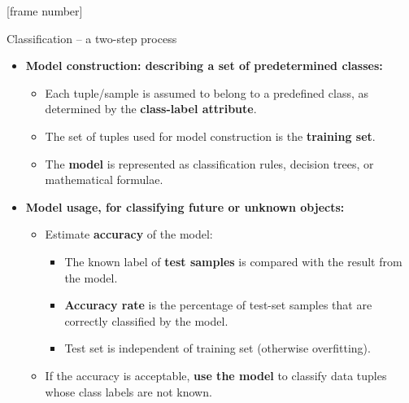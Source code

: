 \documentclass[aspectratio=169,t,table]{beamer}
\begin{document}
  {
    [frame number]
    \begin{frame}{Classification -- a two-step process}
        \begin{itemize}
            \item \textbf{Model construction: describing a set of predetermined classes:}
            \begin{itemize}
              \item Each tuple/sample is assumed to belong to a predefined class, as determined by the \textbf{\color{airforceblue}class-label attribute}.
              \item The set of tuples used for model construction is the \textbf{\color{airforceblue}training set}.
              \item The \textbf{\color{airforceblue}model} is represented as classification rules, decision trees, or mathematical formulae.
            \end{itemize}
            \item \textbf{Model usage, for classifying future or unknown objects:}
            \begin{itemize}
              \item Estimate \textbf{\color{airforceblue}accuracy} of the model:
              \begin{itemize}
                \item The known label of \textbf{test samples} is compared with the result from the model.
                \item \textbf{Accuracy rate} is the percentage of test-set samples that are correctly classified by the model.
                \item Test set is independent of training set (otherwise overfitting).
              \end{itemize}
              \item If the accuracy is acceptable, \textbf{\color{airforceblue}use the model} to classify data tuples whose class labels are not known.
            \end{itemize}
        \end{itemize}
    \end{frame}
  }
\end{document}
